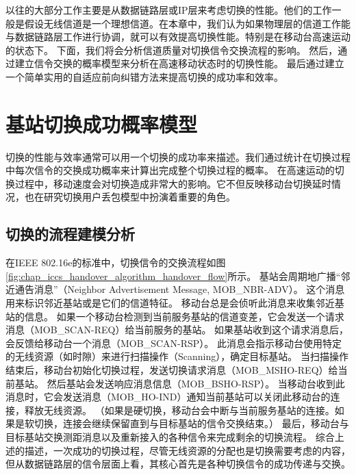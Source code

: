 以往的大部分工作主要是从数据链路层或IP层来考虑切换的性能。他们的工作一般是假设无线信道是一个理想信道。在本章中，我们认为如果物理层的信道工作能与数据链路层工作进行协调，就可以有效提高切换性能。特别是在移动台高速运动的状态下。
下面，我们将会分析信道质量对切换信令交换流程的影响。
然后，通过建立信令交换的概率模型来分析在高速移动状态时的切换性能。
最后通过建立一个简单实用的自适应前向纠错方法来提高切换的成功率和效率。


\section{基站切换成功概率模型}
\label{section_iccs_handover_algorithm_mobility_analysis}
切换的性能与效率通常可以用一个切换的成功率来描述。我们通过统计在切换过程中每次信令的交换成功概率来计算出完成整个切换过程的概率。
在高速运动的切换过程中，移动速度会对切换造成非常大的影响。它不但反映移动台切换延时情况，也在研究切换用户丢包模型中扮演着重要的角色。
\subsection{切换的流程建模分析}
\label{subsection_iccs_handover_algorithm_mobility_analysis_handover_flow}
在IEEE 802.16e的标准中，切换信令的交换流程如图\ref{fig:chap_iccs_handover_algorithm_handover_flow}所示。
基站会周期地广播“邻近通告消息”（Neighbor Advertisement Message, MOB\_NBR-ADV）。
这个消息用来标识邻近基站或是它们的信道特征。
移动台总是会侦听此消息来收集邻近基站的信息。
如果一个移动台检测到当前服务基站的信道变差，它会发送一个请求消息（MOB\_SCAN-REQ）给当前服务的基站。
如果基站收到这个请求消息后，会反馈给移动台一个消息（MOB\_SCAN-RSP）。
此消息会指示移动台使用特定的无线资源（如时隙）来进行扫描操作（Scanning），确定目标基站。
当扫描操作结束后，移动台初始化切换过程，发送切换请求消息（MOB\_MSHO-REQ）给当前基站。
然后基站会发送响应消息信息（MOB\_BSHO-RSP）。
当移动台收到此消息时，它会发送消息（MOB\_HO-IND）通知当前基站可以关闭此移动台的连接，释放无线资源。
（如果是硬切换，移动台会中断与当前服务基站的连接。如果是软切换，连接会继续保留直到与目标基站的信令交换结束。）
最后，移动台与目标基站交换测距消息以及重新接入的各种信令来完成剩余的切换流程。
综合上述的描述，一次成功的切换过程，尽管无线资源的分配也是切换需要考虑的内容，
但从数据链路层的信令层面上看，其核心首先是各种切换信令的成功传递与交换。

